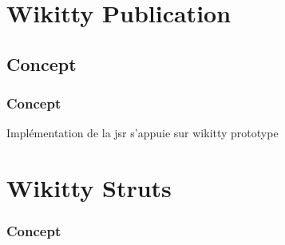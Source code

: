 \documentclass[12pt,a4paper,utf8x]{beamer}
\begin{document}
\section{Wikitty Publication} 
\subsection{Concept}
\begin{frame}\frametitle{Concept}

Implémentation de la jsr
s'appuie sur wikitty
prototype

\end{frame}




\section{Wikitty Struts} 

\begin{frame}\frametitle{Concept}


\end{frame}
\end{document}
